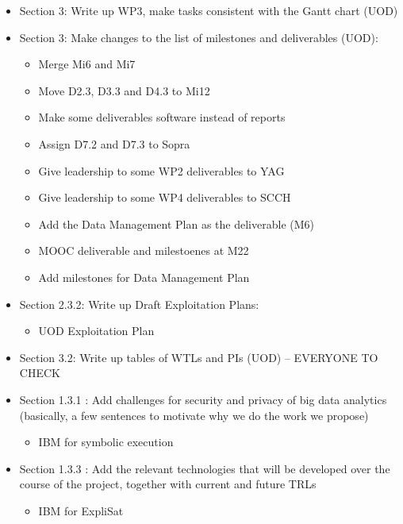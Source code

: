 \documentclass[a4paper,11pt]{article}
\begin{document}
\begin{itemize}
\item Section 3: Write up WP3, make tasks consistent with the Gantt chart (UOD)

\item Section 3: Make changes to the list of milestones and deliverables (UOD):
\begin{itemize}
\item Merge Mi6 and Mi7
\item Move D2.3, D3.3 and D4.3 to Mi12
\item Make some deliverables software instead of reports
\item Assign D7.2 and D7.3 to Sopra
\item Give leadership to some WP2 deliverables to YAG
\item Give leadership to some WP4 deliverables to SCCH
\item Add the Data Management Plan as the deliverable (M6) 
\item MOOC deliverable and milestoenes at M22 
\item Add milestones for Data Management Plan
\end{itemize}

\item Section 2.3.2: Write up Draft Exploitation Plans:
\begin{itemize}
\item UOD Exploitation Plan
\end{itemize}

\item Section 3.2: Write up tables of WTLs and PIs (UOD) -- EVERYONE TO CHECK

\item Section 1.3.1 : Add challenges for security and privacy of big data analytics (basically, a few sentences to motivate why we do the work we propose)

\begin{itemize}
\item IBM for symbolic execution
\end{itemize}

\item Section 1.3.3 : Add the relevant technologies that will be developed over the course of the project, together with current and future TRLs
\begin{itemize}
\item IBM for ExpliSat
\end{itemize}

\end{itemize}
\end{document}
